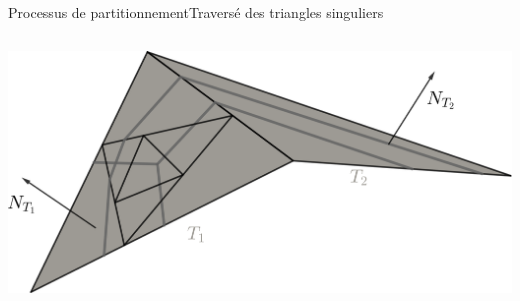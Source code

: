 \documentclass[compress,10pt,aspectratio=169]{beamer}
\begin{document}
\begin{frame}{Processus de partitionnement}{Traversé des triangles singuliers}
\begin{columns}
\begin{column}{0.7\textwidth}
{\includegraphics[scale=0.2]{images/singulier_sepa_space.pdf}\hspace{0.5cm}
}
\end{column}
\end{columns}
\end{frame}
\end{document}
